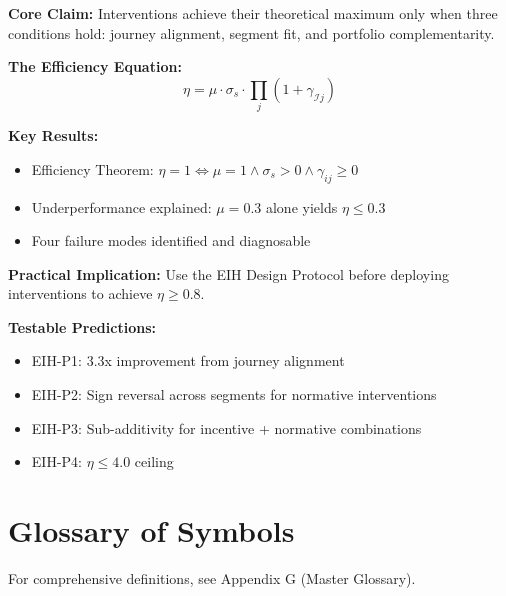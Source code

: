 \begin{tcolorbox}[colback=green!10!white, colframe=green!75!black,
    title=\textbf{Appendix CAL1 Summary: The Efficient Intervention Hypothesis}]

\textbf{Core Claim:}
Interventions achieve their theoretical maximum only when three conditions hold:
journey alignment, segment fit, and portfolio complementarity.

\textbf{The Efficiency Equation:}
\begin{equation*}
\eta = \mu \cdot \sigma_s \cdot \prod_j (1 + \gamma_{\mathcal{I}j})
\end{equation*}

\textbf{Key Results:}
\begin{itemize}[nosep]
\item Efficiency Theorem: $\eta = 1 \Leftrightarrow \mu = 1 \land \sigma_s > 0 \land \gamma_{ij} \geq 0$
\item Underperformance explained: $\mu = 0.3$ alone yields $\eta \leq 0.3$
\item Four failure modes identified and diagnosable
\end{itemize}

\textbf{Practical Implication:}
Use the EIH Design Protocol before deploying interventions to achieve $\eta \geq 0.8$.

\textbf{Testable Predictions:}
\begin{itemize}[nosep]
\item EIH-P1: 3.3x improvement from journey alignment
\item EIH-P2: Sign reversal across segments for normative interventions
\item EIH-P3: Sub-additivity for incentive + normative combinations
\item EIH-P4: $\eta \leq 4.0$ ceiling
\end{itemize}

\end{tcolorbox}


\section{Glossary of Symbols}

For comprehensive definitions, see Appendix G (Master Glossary).

\label{sec:eih-glossary}

